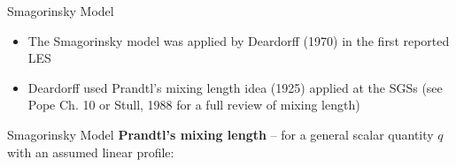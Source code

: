 \begin{frame}{Smagorinsky Model}
\begin{itemize}
	\item The Smagorinsky model was applied by Deardorff (1970) in the first reported LES
	\item Deardorff used Prandtl’s mixing length idea (1925) applied at the SGSs (see Pope Ch. 10 or Stull, 1988 for a full review of mixing length)
\end{itemize}

\end{frame}

\begin{frame}{Smagorinsky Model}
\textbf{Prandtl's mixing length} -- for a general scalar quantity $q$ with an assumed linear profile:


\end{frame}
